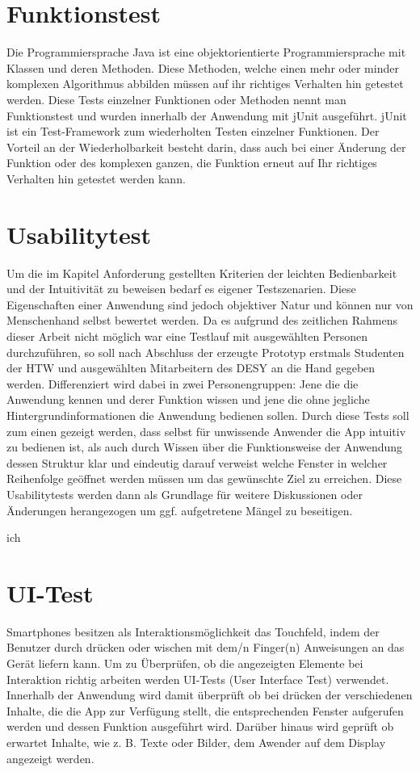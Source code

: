 \documentclass[10pt, a4paper,headsepline]{scrreprt}
\begin{document}
\section{Funktionstest}
Die Programmiersprache Java ist eine objektorientierte Programmiersprache mit Klassen und deren Methoden. Diese Methoden, welche einen mehr oder minder komplexen Algorithmus abbilden müssen auf ihr richtiges Verhalten hin getestet werden. Diese Tests einzelner Funktionen oder Methoden nennt man Funktionstest und wurden innerhalb der Anwendung mit jUnit ausgeführt. jUnit ist ein Test-Framework zum wiederholten Testen einzelner Funktionen. Der Vorteil an der Wiederholbarkeit besteht darin, dass auch bei einer Änderung der Funktion oder des komplexen ganzen, die Funktion erneut auf Ihr richtiges Verhalten hin getestet werden kann.   


\section{Usabilitytest}
Um die im Kapitel Anforderung gestellten Kriterien der leichten Bedienbarkeit und der Intuitivität zu beweisen bedarf es eigener Testszenarien. Diese Eigenschaften einer Anwendung sind jedoch objektiver Natur und können nur von Menschenhand selbst bewertet werden. Da es aufgrund des zeitlichen Rahmens dieser Arbeit nicht möglich war eine Testlauf mit ausgewählten Personen durchzuführen, so soll nach Abschluss der erzeugte Prototyp erstmals Studenten der HTW und ausgewählten Mitarbeitern des DESY an die Hand gegeben werden. Differenziert wird dabei in zwei Personengruppen: Jene die die Anwendung kennen und derer Funktion wissen und jene die ohne jegliche Hintergrundinformationen die Anwendung bedienen sollen. Durch diese Tests soll zum einen gezeigt werden, dass  selbst für unwissende Anwender die App intuitiv zu bedienen ist, als auch durch Wissen über die Funktionsweise der Anwendung dessen Struktur klar und eindeutig darauf verweist welche Fenster in welcher Reihenfolge geöffnet werden müssen um das gewünschte Ziel zu erreichen. Diese Usabilitytests werden dann als Grundlage für weitere Diskussionen oder Änderungen herangezogen um ggf. aufgetretene Mängel zu beseitigen.

ich
\section{UI-Test}
Smartphones besitzen als Interaktionsmöglichkeit das Touchfeld, indem der Benutzer durch drücken oder wischen mit dem/n Finger(n) Anweisungen an das Gerät liefern kann. Um zu Überprüfen, ob die angezeigten Elemente bei Interaktion richtig arbeiten werden UI-Tests (User Interface Test) verwendet. Innerhalb der Anwendung wird damit überprüft ob bei drücken der verschiedenen Inhalte, die die App zur Verfügung stellt, die entsprechenden Fenster aufgerufen werden und dessen Funktion ausgeführt wird. Darüber hinaus wird geprüft ob erwartet Inhalte, wie z. B. Texte oder Bilder, dem Awender auf dem Display angezeigt werden. 
\end{document}
